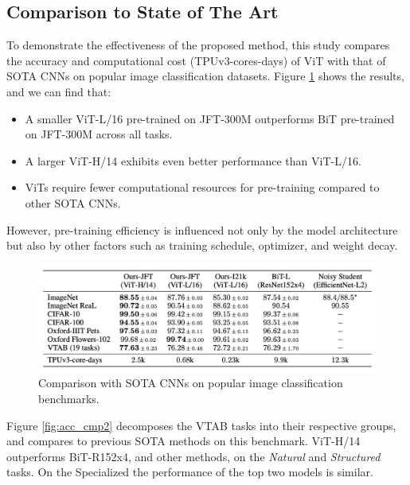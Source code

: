 \documentclass[12pt]{article}
\begin{document}



\subsection{Comparison to State of The Art}

To demonstrate the effectiveness of the proposed method, this study compares the accuracy and computational cost (TPUv3-cores-days) of ViT with that of SOTA CNNs on popular image classification datasets. Figure \ref{fig:acc_cmp} shows the results, and we can find that:

\begin{itemize}
    \item A smaller ViT-L/16 pre-trained on JFT-300M outperforms BiT pre-trained on JFT-300M across all tasks.
    \item A larger ViT-H/14 exhibits even better performance than ViT-L/16.
    \item ViTs require fewer computational resources for pre-training compared to other SOTA CNNs.
\end{itemize}

However, pre-training efficiency is influenced not only by the model architecture but also by other factors such as training schedule, optimizer, and weight decay.

\begin{figure}
    \centering
    \includegraphics[width=1\linewidth]{images/acc_cmp1.png}
    \caption{Comparison with SOTA CNNs on popular image classification benchmarks.}
    \label{fig:acc_cmp}
\end{figure}

Figure \ref{fig:acc_cmp2} decomposes the VTAB tasks into their respective groups, and compares to previous SOTA methods on this benchmark. ViT-H/14 outperforms BiT-R152x4, and other methods, on the \textit{Natural} and \textit{Structured} tasks. On the Specialized the performance of the top two models is similar.
\end{document}

